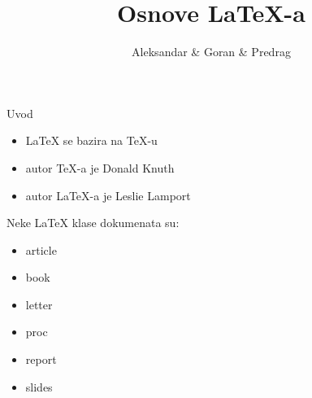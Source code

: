\documentclass{beamer}
\title{Osnove \LaTeX{}-a}
\author{Aleksandar \& Goran \& Predrag}
\institute{Univerzitet u Beogradu}
\date{}
\begin{document}
\begin{frame}
\titlepage
\end{frame}
\begin{frame}{Uvod}
\begin{itemize}
\item \LaTeX{} se bazira na \TeX{}-u
\item autor \TeX{}-a je Donald Knuth
\item autor \LaTeX{}-a je Leslie Lamport
\end{itemize}
Neke \LaTeX{} klase dokumenata su:
\begin{itemize}
\item article
\item book
\item letter
\item proc
\item report
\item slides
\end{itemize}
\end{frame}
\end{document}
